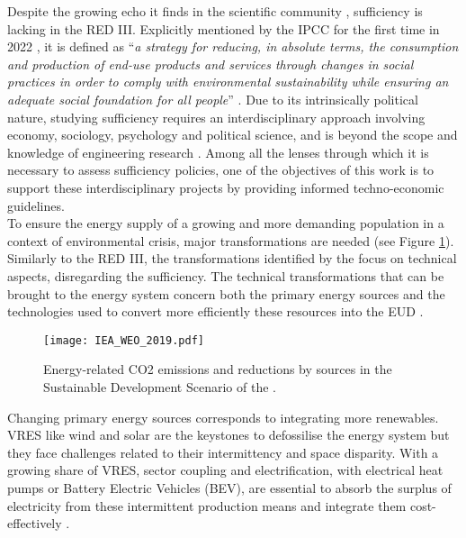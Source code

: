 Despite the growing echo it finds in the scientific community \cite{o2018good}, sufficiency is lacking in the RED III. Explicitly mentioned by the IPCC for the first time in 2022 \cite{IPCC2022}, it is defined as ``\emph{a strategy for reducing, in absolute terms, the consumption and production of end-use products and services through changes in social practices in order to comply with environmental sustainability while ensuring an adequate social foundation for all people}'' \cite{lage2023citizens}. Due to its intrinsically political nature, studying sufficiency requires an interdisciplinary approach involving economy, sociology, psychology and political science, and is beyond the scope and knowledge of engineering research \cite{schmidt2015interdisciplinary}. Among all the lenses through which it is necessary to assess sufficiency policies, one of the objectives of this work is to support these interdisciplinary projects by providing informed techno-economic guidelines.\\

\noindent
To ensure the energy supply of a growing and more demanding population in a context of environmental crisis, major transformations are needed (see Figure \ref{fig:intro:IEA_WEO_2019}). Similarly to the RED III, the transformations identified by the \citet{iea2020world} focus on technical aspects, disregarding the sufficiency.  The technical transformations that can be brought to the energy system concern both the primary energy sources and the technologies used to convert more efficiently these resources into the \gls{EUD} \cite{iea2020world,luderer2018residual}. 

\begin{figure}[ht!]
\centering
\texttt{[image: IEA\_WEO\_2019.pdf]}
\caption{Energy-related CO2 emissions and reductions by sources in the Sustainable Development Scenario of the \citet{iea2020world}.}
\label{fig:intro:IEA_WEO_2019}
\end{figure}

Changing primary energy sources corresponds to integrating more renewables. \gls{VRES} like wind and solar are the keystones to defossilise the energy system but they face challenges related to their intermittency and space disparity.  With a growing share of \gls{VRES}, sector coupling and electrification, with electrical heat pumps or Battery Electric Vehicles (BEV), are essential to absorb the surplus of electricity from these intermittent production means \cite{robinius2017linking} and integrate them cost-effectively \cite{brown2018response, limpensECOS2021}. 

